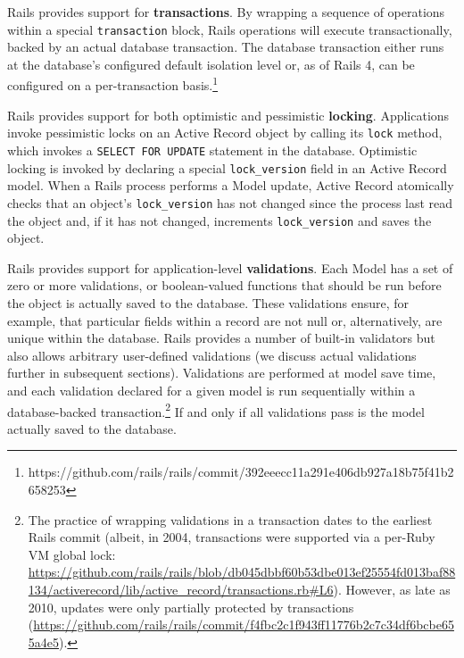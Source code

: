 \begin{myenumerate}
\item Rails provides support for \textbf{transactions}. By wrapping a
sequence of operations within a special \texttt{transaction} block,
Rails operations will execute transactionally, backed by an actual
database transaction. The database transaction either runs at the
database's configured default isolation level or, as of Rails 4, can
be configured on a per-transaction
basis.\footnote{https://github.com/rails/rails/commit/392eeecc11a291e406db927a18b75f41b2658253}

\item Rails provides support for both optimistic and pessimistic
\textbf{locking}. Applications invoke pessimistic locks on an Active
Record object by calling its \texttt{lock} method, which invokes a
\texttt{SELECT FOR UPDATE} statement in the database. Optimistic
locking is invoked by declaring a special \texttt{lock\_version} field
in an Active Record model. When a Rails process performs a Model
update, Active Record atomically checks that an object's
\texttt{lock\_version} has not changed since the process last read the
object and, if it has not changed, increments \texttt{lock\_version}
and saves the object.

\item Rails provides support for application-level
\textbf{validations}. Each Model has a set of zero or more
validations, or boolean-valued functions that should be run before the
object is actually saved to the database. These validations ensure,
for example, that particular fields within a record are not null or,
alternatively, are unique within the database. Rails provides a number
of built-in validators but also allows arbitrary user-defined
validations (we discuss actual validations further in subsequent
sections). Validations are performed at model save time, and each
validation declared for a given model is run sequentially within a
database-backed transaction.\footnote{The practice of wrapping
  validations in a transaction dates to the earliest Rails
  commit (albeit, in 2004, transactions were supported via a per-Ruby VM
  global lock: \url{https://github.com/rails/rails/blob/db045dbbf60b53dbe013ef25554fd013baf88134/activerecord/lib/active_record/transactions.rb#L6}). However,
  as late as 2010, updates were only partially protected by transactions
  (\url{https://github.com/rails/rails/commit/f4fbc2c1f943ff11776b2c7c34df6bcbe655a4e5}).} If and only if all validations pass is the
model actually saved to the database.\\[-2mm]


\end{myenumerate}
